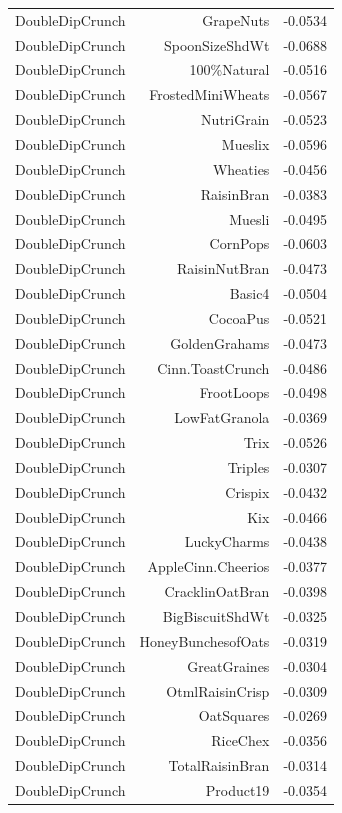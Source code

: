 \begin{longtable}{@{}lrr@{}}
DoubleDipCrunch & GrapeNuts & -0.0534 \\
DoubleDipCrunch & SpoonSizeShdWt & -0.0688 \\
DoubleDipCrunch & 100\%Natural & -0.0516 \\
DoubleDipCrunch & FrostedMiniWheats & -0.0567 \\
DoubleDipCrunch & NutriGrain & -0.0523 \\
DoubleDipCrunch & Mueslix & -0.0596 \\
DoubleDipCrunch & Wheaties & -0.0456 \\
DoubleDipCrunch & RaisinBran & -0.0383 \\
DoubleDipCrunch & Muesli & -0.0495 \\
DoubleDipCrunch & CornPops & -0.0603 \\
DoubleDipCrunch & RaisinNutBran & -0.0473 \\
DoubleDipCrunch & Basic4 & -0.0504 \\
DoubleDipCrunch & CocoaPus & -0.0521 \\
DoubleDipCrunch & GoldenGrahams & -0.0473 \\
DoubleDipCrunch & Cinn.ToastCrunch & -0.0486 \\
DoubleDipCrunch & FrootLoops & -0.0498 \\
DoubleDipCrunch & LowFatGranola & -0.0369 \\
DoubleDipCrunch & Trix & -0.0526 \\
DoubleDipCrunch & Triples & -0.0307 \\
DoubleDipCrunch & Crispix & -0.0432 \\
DoubleDipCrunch & Kix & -0.0466 \\
DoubleDipCrunch & LuckyCharms & -0.0438 \\
DoubleDipCrunch & AppleCinn.Cheerios & -0.0377 \\
DoubleDipCrunch & CracklinOatBran & -0.0398 \\
DoubleDipCrunch & BigBiscuitShdWt & -0.0325 \\
DoubleDipCrunch & HoneyBunchesofOats & -0.0319 \\
DoubleDipCrunch & GreatGraines & -0.0304 \\
DoubleDipCrunch & OtmlRaisinCrisp & -0.0309 \\
DoubleDipCrunch & OatSquares & -0.0269 \\
DoubleDipCrunch & RiceChex & -0.0356 \\
DoubleDipCrunch & TotalRaisinBran & -0.0314 \\
DoubleDipCrunch & Product19 & -0.0354 \\

\end{longtable}
